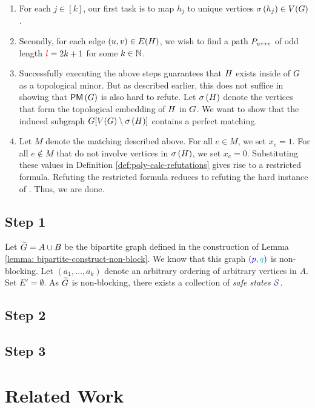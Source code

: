 \documentclass[11pt]{article}
\newcommand{\PerfectMatching}[1]{\mathsf{PM}\left(#1\right)}
\begin{document}
\begin{enumerate}
	\item For each $j \in [k]$, our first task is to map $h_j$ to unique vertices $\sigma\left(h_j\right) \in V(G)$. 
	\item Secondly, for each edge $(u,v) \in E(H)$, we wish to find a path $P_{u \leftrightarrow v}$ of odd length $\textcolor{red}{l} = 2k +1 $ for some $k \in \mathbb{N}$.
	\item Successfully executing the above steps guarantees that $H$ exists inside of $G$ as a topological minor. But as described earlier, this does not suffice in showing that $\PerfectMatching{\Graph}$ is also hard to refute. Let $\sigma\left(H\right)$ denote the vertices that form the topological embedding of $H$ in $G$. We want to show that the induced subgraph $G[V(G) \setminus \sigma\left(H\right)]$ contains a perfect matching. 
	\item Let $M$ denote the matching described above. For all $e \in M$, we set $x_e =1$. For all $e \notin M$ that do not involve vertices in $\sigma\left(H\right)$, we set $x_e = 0$. Substituting these values in Definition \ref{def:poly-calc-refutations} gives rise to a restricted formula. Refuting the restricted formula reduces to refuting the hard instance of . Thus, we are done.
\end{enumerate}

\subsection{Step 1}

Let $\widetilde{G} = A \cup B$ be the bipartite graph defined in the construction of Lemma \ref{lemma: bipartite-construct-non-block}.
We know that this graph $(\pee, \qu)$ is non-blocking.
Let $(a_1, \dots, a_k)$ denote an arbitrary ordering of arbitrary vertices in $A$.
Set $E' = \emptyset$. 
As $\widetilde{G}$ is non-blocking, there exists a collection of \emph{safe states} $\SafeStates$.


\subsection{Step 2}

\subsection{Step 3}

\section{Related Work}

\clearpage


\end{document}
